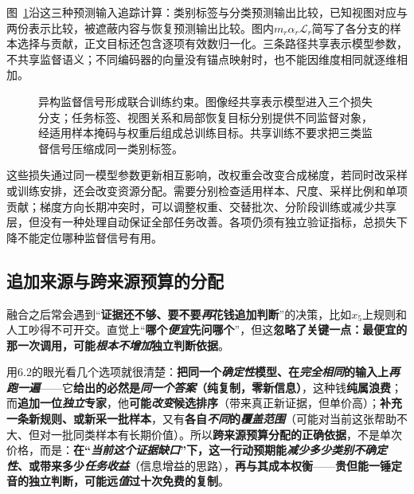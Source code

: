 图~\ref{fig:knowledge-fusion-heterogeneous-training}沿这三种预测输入追踪计算：类别标签与分类预测输出比较，已知视图对应与两份表示比较，被遮蔽内容与恢复预测输出比较。图内$m_r\alpha_r\mathcal{L}_r$简写了各分支的样本选择与贡献，正文目标还包含逐项有效数归一化。三条路径共享表示模型参数，不共享监督语义；不同编码器的向量没有锚点映射时，也不能因维度相同就逐维相加。

\begin{figure}[htbp]
  \centering
  
  \caption{异构监督信号形成联合训练约束。图像经共享表示模型进入三个损失分支；任务标签、视图关系和局部恢复目标分别提供不同监督对象，经适用样本掩码与权重后组成总训练目标。共享训练不要求把三类监督信号压缩成同一类别标签。}
  \label{fig:knowledge-fusion-heterogeneous-training}
\end{figure}
\FloatBarrier

这些损失通过同一模型参数更新相互影响，改权重会改变合成梯度，若同时改采样或训练安排，还会改变资源分配。需要分别检查适用样本、尺度、采样比例和单项贡献；梯度方向长期冲突时，可以调整权重、交替批次、分阶段训练或减少共享层，但没有一种处理自动保证全部任务改善。各项仍须有独立验证指标，总损失下降不能定位哪种监督信号有用。

\subsection{追加来源与跨来源预算的分配}
\label{sec:knowledge-fusion-source-budget}

融合之后常会遇到“\textbf{证据还不够、要不要\emph{再}花钱追加判断}”的决策，比如$x_5$上规则和人工吵得不可开交。直觉上“\textbf{哪个\emph{便宜}先问哪个}”，但这\textbf{忽略了关键一点：\textbf{最便宜的那一次调用，可能\emph{根本不增加}独立判断依据}}。

用6.2的眼光看几个选项就很清楚：\textbf{把同一个\emph{确定性}模型、在\emph{完全相同}的输入上\emph{再跑一遍}}——它\textbf{给出的必然是\emph{同一个答案}（纯复制，零新信息）}，这种钱\textbf{纯属浪费}；而\textbf{追加一位\emph{独立}专家}，他\textbf{可能\emph{改变}候选排序}（带来真正新证据，但单价高）；\textbf{补充一条新规则、或新采一批样本}，又有\textbf{各自\emph{不同}的\emph{覆盖范围}}（可能对当前这张帮助不大、但对一批同类样本有长期价值）。所以\textbf{跨来源预算分配的正确依据}，不是单次价格，而是：\textbf{在“\emph{当前这个\emph{证据缺口}}”下，这一行动预期能\emph{减少多少类别不确定性}、或带来多少\emph{任务收益}}（信息增益的思路），\textbf{再与其成本权衡}——\textbf{贵但能一锤定音的独立判断，可能远\emph{值}过十次免费的复制}。

